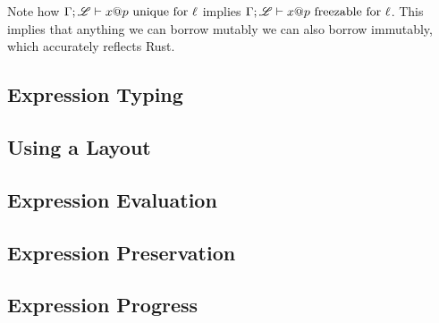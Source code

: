 

Note how ${\Gamma};{\mathscr{L}}\vdash{{x}@{p}}\ \textrm{unique for}\ {\ell}$ implies ${\Gamma};{\mathscr{L}}\vdash{{x}@{p}}\ \textrm{freezable for}\ {\ell}$.
This implies that anything we can borrow mutably we can also borrow immutably,
which accurately reflects Rust.

\subsection*{Expression Typing}

\subsection*{Using a Layout}

\subsection*{Expression Evaluation}

\subsection*{Expression Preservation}

\subsection*{Expression Progress}
